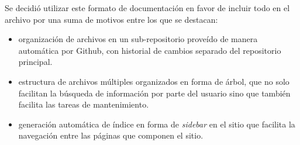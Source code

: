 
Se decidió utilizar este formato de documentación en favor de incluir todo en el archivo  por una suma de motivos entre los que se destacan:

\begin{itemize}
  \item organización de archivos en un sub-repositorio proveído de manera automática por Github, con historial de cambios separado del repositorio principal.
  \item estructura de archivos múltiples organizados en forma de árbol, que no solo facilitan la búsqueda de información por parte del usuario sino que también facilita las tareas de mantenimiento.
  \item generación automática de índice en forma de \textit{sidebar} en el sitio que facilita la navegación entre las páginas que componen el sitio.
\end{itemize}
